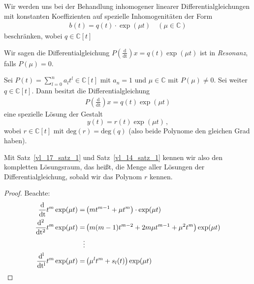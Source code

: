 
	Wir werden uns bei der Behandlung inhomogener linearer Differentialgleichungen 
	mit konstanten Koeffizienten auf spezielle Inhomogenitäten der Form
	\begin{align*}
		b(t) = q(t) \cdot \exp(\mu t) \quad (\mu \in \mathbb{C})
	\end{align*}
	beschränken, wobei $q \in \mathbb{C} [t]$
\begin{Definition}{
	Wir sagen die Differentialgleichung $P\left( \frac{\mathrm{d}}
	{\mathrm{dt}}\right)x = q(t) \exp(\mu t)$ ist in \emph{Resonanz}, falls 
	$P(\mu) = 0$.
}\end{Definition}

\begin{Satz}{\label{vl_17_satz_1}
	Sei $P(t) = \sum_{l=0}^n a_l t^l \in \mathbb{C}[t]$ mit 
	$a_n = 1$ und $\mu \in \mathbb{C}$ mit $P(\mu) \neq 0$. Sei weiter 
	$q \in \mathbb{C}[t]$. Dann besitzt die Differentialgleichung 
	\begin{align*}
		P\left(\frac{\mathrm{d}}{\mathrm{dt}}\right) x = q(t) \exp(\mu t)
	\end{align*}
	eine spezielle Lösung der Gestalt
	$$y(t) = r(t) \exp(\mu t)\,,$$
	wobei  $r \in \mathbb{C}[t]$ mit $\mathrm{deg} (r) = \mathrm{deg}(q)$ (also beide Polynome den gleichen Grad haben).
}\end{Satz}

\begin{Bemerkung}{
	Mit Satz~\ref{vl_17_satz_1}  und Satz~\ref{vl_14_satz_1}  kennen wir also den kompletten 
	Lösungsraum, das heißt, die Menge aller Lösungen der Differentialgleichung,
	sobald wir das Polynom $r$ kennen.
}\end{Bemerkung}
\begin{proof}
	Beachte: 
	\begin{align}
		\frac{\mathrm{d}}{\mathrm{dt}} t^m \exp ( \mu t) = 
			& \left( m t^{m-1} + \mu t^m \right) \cdot \exp(\mu t) \notag \\
		 \frac{\mathrm{d^2}}{\mathrm{dt^2}} 
		 t^m \exp ( \mu t) = & \left( m (m-1) t^{m-2} + 
			 2m \mu t^{m-1} + {\mu}^2 t^m \right) \exp(\mu t) \notag \\
		 \vdots \notag
		 \\
		 \frac{\mathrm{d^l}}{\mathrm{dt^l}} t^m \exp(\mu t) 
		 	= & \left( {\mu}^l t^m + s_l(t) \right)\exp(\mu t)  \label{vl_17_gl_1}
	\end{align}
\end{proof}

